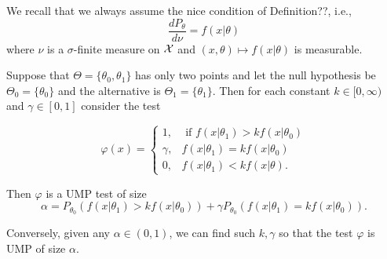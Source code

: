 \documentclass[twoside, a4paper, 10pt]{amsart}
\begin{document}
We recall that we always assume the nice condition of Definition??, i.e., $$\frac{dP_{\theta}}{d\nu} = f(x|\theta)$$ where $\nu$ is a $\sigma$-finite measure on $\mathcal{X}$ and $(x,\theta) \mapsto f(x|\theta)$ is measurable.

\begin{prop} Suppose that $\Theta = \{\theta_0, \theta_1\}$ has only two points and let the null hypothesis be $\Theta_0 = \{ \theta_0\}$ and the alternative is $\Theta_1 = \{ \theta_1 \}$. Then for each constant $k \in [0,\infty)$ and $\gamma \in [0,1]$ consider the test 

$$\varphi(x) = 
\begin{cases}
1, & \text{ if } f(x|\theta_1) > kf(x|\theta_0) \\
\gamma, & f(x|\theta_1) = k f(x|\theta_0) \\  
0, & f(x|\theta_1) < kf(x|\theta).\end{cases}$$

Then $\varphi$ is a UMP test of size $$\alpha = P_{\theta_0}\left(f(x|\theta_1) > kf(x|\theta_0) \right) + \gamma P_{\theta_0} \left(f(x|\theta_1) = k f(x|\theta_0)\right).$$

Conversely, given any $\alpha \in (0,1)$, we can find such $k,\gamma$ so that the test $\varphi$ is UMP of size $\alpha$. \end{prop}
\end{document}
